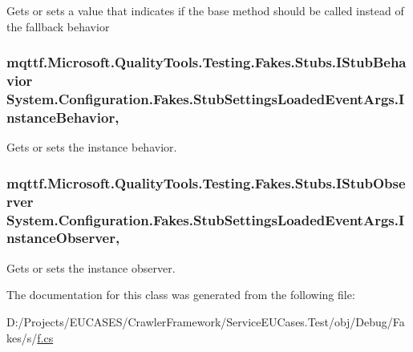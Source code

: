 Gets or sets a value that indicates if the base method should be called instead of the fallback behavior

\hypertarget{class_system_1_1_configuration_1_1_fakes_1_1_stub_settings_loaded_event_args_ad84602dcb88f5ace0425395b483807c5}{
\subsubsection[{Instance\-Behavior}]{\setlength{\rightskip}{0pt plus 5cm}mqttf.\-Microsoft.\-Quality\-Tools.\-Testing.\-Fakes.\-Stubs.\-I\-Stub\-Behavior System.\-Configuration.\-Fakes.\-Stub\-Settings\-Loaded\-Event\-Args.\-Instance\-Behavior\hspace{0.3cm}{\ttfamily [get]}, {\ttfamily [set]}}}\label{class_system_1_1_configuration_1_1_fakes_1_1_stub_settings_loaded_event_args_ad84602dcb88f5ace0425395b483807c5}


Gets or sets the instance behavior.

\hypertarget{class_system_1_1_configuration_1_1_fakes_1_1_stub_settings_loaded_event_args_ae1aef1f906331526557f06ee6fe00dee}{
\subsubsection[{Instance\-Observer}]{\setlength{\rightskip}{0pt plus 5cm}mqttf.\-Microsoft.\-Quality\-Tools.\-Testing.\-Fakes.\-Stubs.\-I\-Stub\-Observer System.\-Configuration.\-Fakes.\-Stub\-Settings\-Loaded\-Event\-Args.\-Instance\-Observer\hspace{0.3cm}{\ttfamily [get]}, {\ttfamily [set]}}}\label{class_system_1_1_configuration_1_1_fakes_1_1_stub_settings_loaded_event_args_ae1aef1f906331526557f06ee6fe00dee}


Gets or sets the instance observer.



The documentation for this class was generated from the following file\-:\begin{DoxyCompactItemize}
\item 
D\-:/\-Projects/\-E\-U\-C\-A\-S\-E\-S/\-Crawler\-Framework/\-Service\-E\-U\-Cases.\-Test/obj/\-Debug/\-Fakes/s/\hyperlink{s_2f_8cs}{f.\-cs}\end{DoxyCompactItemize}
